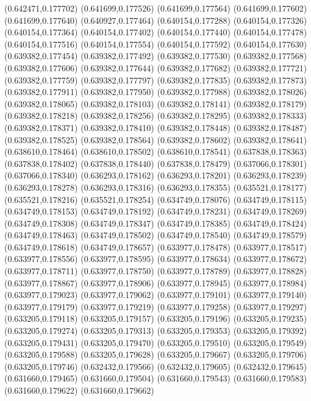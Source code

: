 (0.642471,0.177702)
(0.641699,0.177526)
(0.641699,0.177564)
(0.641699,0.177602)
(0.641699,0.177640)
(0.640927,0.177464)
(0.640154,0.177288)
(0.640154,0.177326)
(0.640154,0.177364)
(0.640154,0.177402)
(0.640154,0.177440)
(0.640154,0.177478)
(0.640154,0.177516)
(0.640154,0.177554)
(0.640154,0.177592)
(0.640154,0.177630)
(0.639382,0.177454)
(0.639382,0.177492)
(0.639382,0.177530)
(0.639382,0.177568)
(0.639382,0.177606)
(0.639382,0.177644)
(0.639382,0.177682)
(0.639382,0.177721)
(0.639382,0.177759)
(0.639382,0.177797)
(0.639382,0.177835)
(0.639382,0.177873)
(0.639382,0.177911)
(0.639382,0.177950)
(0.639382,0.177988)
(0.639382,0.178026)
(0.639382,0.178065)
(0.639382,0.178103)
(0.639382,0.178141)
(0.639382,0.178179)
(0.639382,0.178218)
(0.639382,0.178256)
(0.639382,0.178295)
(0.639382,0.178333)
(0.639382,0.178371)
(0.639382,0.178410)
(0.639382,0.178448)
(0.639382,0.178487)
(0.639382,0.178525)
(0.639382,0.178564)
(0.639382,0.178602)
(0.639382,0.178641)
(0.638610,0.178464)
(0.638610,0.178502)
(0.638610,0.178541)
(0.637838,0.178363)
(0.637838,0.178402)
(0.637838,0.178440)
(0.637838,0.178479)
(0.637066,0.178301)
(0.637066,0.178340)
(0.636293,0.178162)
(0.636293,0.178201)
(0.636293,0.178239)
(0.636293,0.178278)
(0.636293,0.178316)
(0.636293,0.178355)
(0.635521,0.178177)
(0.635521,0.178216)
(0.635521,0.178254)
(0.634749,0.178076)
(0.634749,0.178115)
(0.634749,0.178153)
(0.634749,0.178192)
(0.634749,0.178231)
(0.634749,0.178269)
(0.634749,0.178308)
(0.634749,0.178347)
(0.634749,0.178385)
(0.634749,0.178424)
(0.634749,0.178463)
(0.634749,0.178502)
(0.634749,0.178540)
(0.634749,0.178579)
(0.634749,0.178618)
(0.634749,0.178657)
(0.633977,0.178478)
(0.633977,0.178517)
(0.633977,0.178556)
(0.633977,0.178595)
(0.633977,0.178634)
(0.633977,0.178672)
(0.633977,0.178711)
(0.633977,0.178750)
(0.633977,0.178789)
(0.633977,0.178828)
(0.633977,0.178867)
(0.633977,0.178906)
(0.633977,0.178945)
(0.633977,0.178984)
(0.633977,0.179023)
(0.633977,0.179062)
(0.633977,0.179101)
(0.633977,0.179140)
(0.633977,0.179179)
(0.633977,0.179219)
(0.633977,0.179258)
(0.633977,0.179297)
(0.633205,0.179118)
(0.633205,0.179157)
(0.633205,0.179196)
(0.633205,0.179235)
(0.633205,0.179274)
(0.633205,0.179313)
(0.633205,0.179353)
(0.633205,0.179392)
(0.633205,0.179431)
(0.633205,0.179470)
(0.633205,0.179510)
(0.633205,0.179549)
(0.633205,0.179588)
(0.633205,0.179628)
(0.633205,0.179667)
(0.633205,0.179706)
(0.633205,0.179746)
(0.632432,0.179566)
(0.632432,0.179605)
(0.632432,0.179645)
(0.631660,0.179465)
(0.631660,0.179504)
(0.631660,0.179543)
(0.631660,0.179583)
(0.631660,0.179622)
(0.631660,0.179662)
